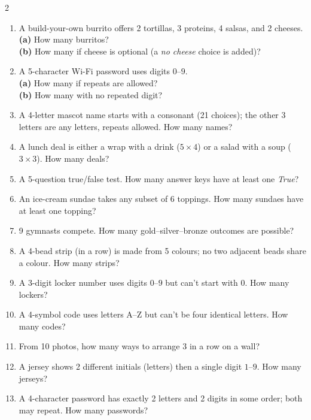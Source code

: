 \documentclass[11pt]{article}
\begin{document}
\begin{recapbox}
\begin{multicols}{2}
\small
\begin{enumerate}[leftmargin=*,itemsep=3pt]
  \item A build-your-own burrito offers 2 tortillas, 3 proteins, 4 salsas, and 2 cheeses. \\ \textbf{(a)} How many burritos? \\ \textbf{(b)} How many if cheese is optional (a \emph{no cheese} choice is added)?
  \item A 5-character Wi-Fi password uses digits $0$--$9$. \\ \textbf{(a)} How many if repeats are allowed? \\ \textbf{(b)} How many with no repeated digit?
  \item A 4-letter mascot name starts with a consonant (21 choices); the other 3 letters are any letters, repeats allowed. How many names?
  \item A lunch deal is either a wrap with a drink ($5\times4$) or a salad with a soup ($3\times3$). How many deals?
  \item A 5-question true/false test. How many answer keys have at least one \emph{True}?
  \item An ice-cream sundae takes any subset of 6 toppings. How many sundaes have at least one topping?
  \item 9 gymnasts compete. How many gold--silver--bronze outcomes are possible?
  \item A 4-bead strip (in a row) is made from 5 colours; no two adjacent beads share a colour. How many strips?
  \item A 3-digit locker number uses digits $0$--$9$ but can't start with $0$. How many lockers?
  \item A 4-symbol code uses letters A--Z but can't be four identical letters. How many codes?
  \item From 10 photos, how many ways to arrange 3 in a row on a wall?
  \item A jersey shows 2 different initials (letters) then a single digit $1$--$9$. How many jerseys?
  \item A 4-character password has exactly 2 letters and 2 digits in some order; both may repeat. How many passwords?
\end{enumerate}
\end{multicols}
\end{recapbox}
\end{document}
